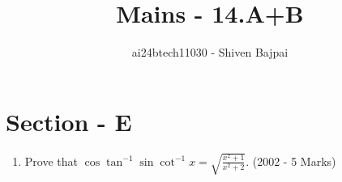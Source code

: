 \documentclass[journal]{IEEEtran}
\begin{document}
\onecolumn

\vspace{3cm}

\renewcommand{\thefigure}{\theenumi}
\renewcommand{\thetable}{\theenumi}

\title{Mains - 14.A+B}
\author{ai24btech11030 - Shiven Bajpai}
\maketitle

\section*{Section - E}
\begin{enumerate}
	\item{
			Prove that $\cos \tan^{-1} \sin \cot^{-1} x = \sqrt{\frac{x^2 + 1}{x^2 + 2}}$. \hfill (2002 - 5 Marks)
		}
\end{enumerate}
\end{document}
